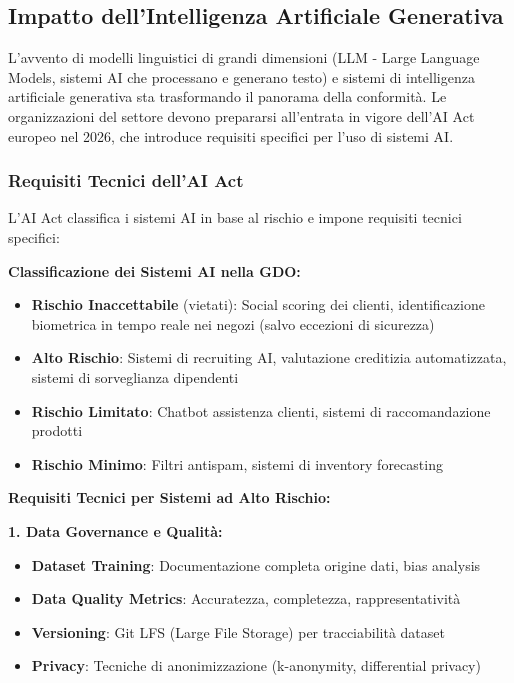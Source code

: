 \subsection{Impatto dell'Intelligenza Artificiale Generativa}

L'avvento di modelli linguistici di grandi dimensioni (LLM - Large Language Models, sistemi AI che processano e generano testo) e sistemi di intelligenza artificiale generativa sta trasformando il panorama della conformità. Le organizzazioni del settore devono prepararsi all'entrata in vigore dell'AI Act europeo nel 2026, che introduce requisiti specifici per l'uso di sistemi AI.

\subsubsection{Requisiti Tecnici dell'AI Act}

L'AI Act classifica i sistemi AI in base al rischio e impone requisiti tecnici specifici:

\textbf{Classificazione dei Sistemi AI nella GDO:}
\begin{itemize}
    \item \textbf{Rischio Inaccettabile} (vietati): Social scoring dei clienti, identificazione biometrica in tempo reale nei negozi (salvo eccezioni di sicurezza)
    \item \textbf{Alto Rischio}: Sistemi di recruiting AI, valutazione creditizia automatizzata, sistemi di sorveglianza dipendenti
    \item \textbf{Rischio Limitato}: Chatbot assistenza clienti, sistemi di raccomandazione prodotti
    \item \textbf{Rischio Minimo}: Filtri antispam, sistemi di inventory forecasting
\end{itemize}

\textbf{Requisiti Tecnici per Sistemi ad Alto Rischio:}

\textbf{1. Data Governance e Qualità:}
\begin{itemize}
    \item \textbf{Dataset Training}: Documentazione completa origine dati, bias analysis
    \item \textbf{Data Quality Metrics}: Accuratezza, completezza, rappresentatività
    \item \textbf{Versioning}: Git LFS (Large File Storage) per tracciabilità dataset
    \item \textbf{Privacy}: Tecniche di anonimizzazione (k-anonymity, differential privacy)
\end{itemize}

